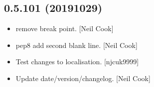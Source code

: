 \documentclass[a4paper,10pt,english]{report}
\begin{document}
\subsection{0.5.101 (2019\sphinxhyphen{}10\sphinxhyphen{}29)}
\label{\detokenize{misc/changelog:id60}}\begin{itemize}
\item {} 
 \sphinxhyphen{} remove break point. {[}Neil Cook{]}

\item {} 
 \sphinxhyphen{} pep8 add second blank line. {[}Neil
Cook{]}

\item {} 
Test changes to localisation. {[}njcuk9999{]}

\item {} 
Update date/version/changelog. {[}Neil Cook{]}

\end{itemize}
\end{document}
